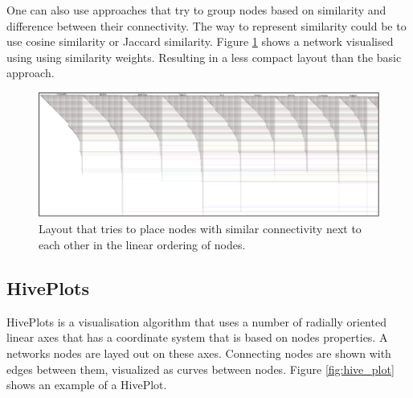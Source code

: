 \documentclass[a4paper,11pt]{kth-mag}
\begin{document}
One can also use approaches that try to group nodes based on similarity and difference between their connectivity. The way to
represent similarity could be to use cosine similarity\cite{website:Wikipedia} or Jaccard similarity\cite{website:Wikipedia2}. Figure \ref{fig:bio_sim} shows a network visualised using 
using similarity weights. Resulting in a less compact layout than the basic approach.
\\


\begin{figure}[!htbp]
	\centering
	\includegraphics[scale=0.5]{BIOSim}
	\caption{Layout that tries to place nodes with similar connectivity next to each other in the linear ordering of nodes.}
	\label{fig:bio_sim}
\end{figure}

\subsection{HivePlots}
HivePlots is a visualisation algorithm that uses a number of radially oriented linear axes that has a coordinate system that is based on nodes properties. A networks nodes are layed out on these axes. Connecting nodes are
shown with edges between them, visualized as curves between nodes. Figure \ref{fig:hive_plot} shows an example of a HivePlot.
\end{document}
